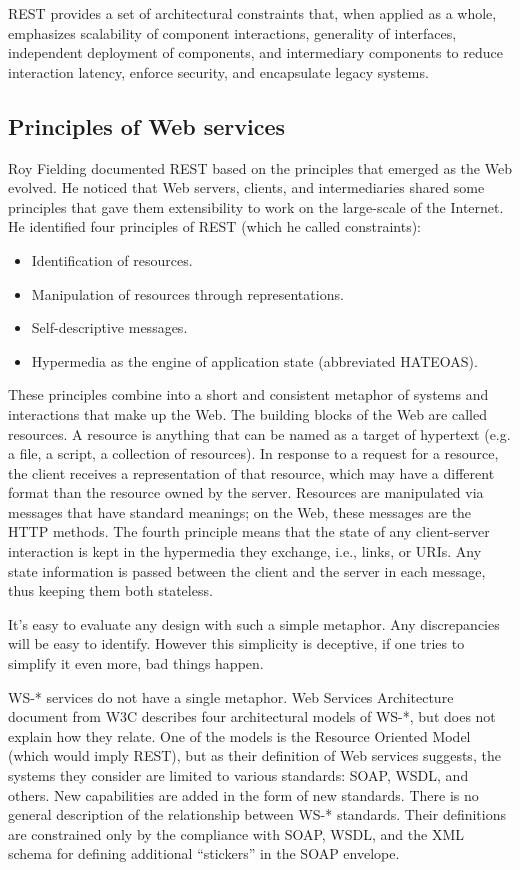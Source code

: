 REST provides a set of architectural constraints that, when applied as a whole, emphasizes scalability of component interactions, generality of interfaces, independent deployment of components, and intermediary components to reduce interaction latency, enforce security, and encapsulate legacy systems\cite{Fielding00Phd}.

\subsection{Principles of Web services}
Roy Fielding documented REST based on the principles that emerged as the Web evolved. He noticed that Web servers, clients, and intermediaries shared some principles that gave them extensibility to work on the large-scale of the Internet. He identified four principles of REST (which he called constraints):
\begin{itemize}
\item Identification of resources.
\item Manipulation of resources through representations.
\item Self-descriptive messages.
\item Hypermedia as the engine of application state (abbreviated HATEOAS).
\end{itemize}

These principles combine into a short and consistent metaphor of systems and interactions that make up the Web. The building blocks of the Web are called resources. A resource is anything that can be named as a target of hypertext (e.g. a file, a script, a collection of resources). In response to a request for a resource, the client receives a representation of that resource, which may have a different format than the resource owned by the server. Resources are manipulated via messages that have standard meanings; on the Web, these messages are the HTTP methods. The fourth principle means that the state of any client-server interaction is kept in the hypermedia they exchange, i.e., links, or URIs. Any state information is passed between the client and the server in each message, thus keeping them both stateless.

It's easy to evaluate any design with such a simple metaphor. Any discrepancies will be easy to identify. However this simplicity is deceptive, if one tries to simplify it even more, bad things happen.

WS-* services do not have a single metaphor. Web Services Architecture document\cite{Booth:2004} from W3C describes four architectural models of WS-*, but does not explain how they relate. One of the models is the Resource Oriented Model (which would imply REST), but as their definition of Web services suggests, the systems they consider are limited to various standards: SOAP, WSDL, and others. New capabilities are added in the form of new standards. There is no general description of the relationship between WS-* standards. Their definitions are constrained only by the compliance with SOAP, WSDL, and the XML schema for defining additional ``stickers'' in the SOAP envelope.

